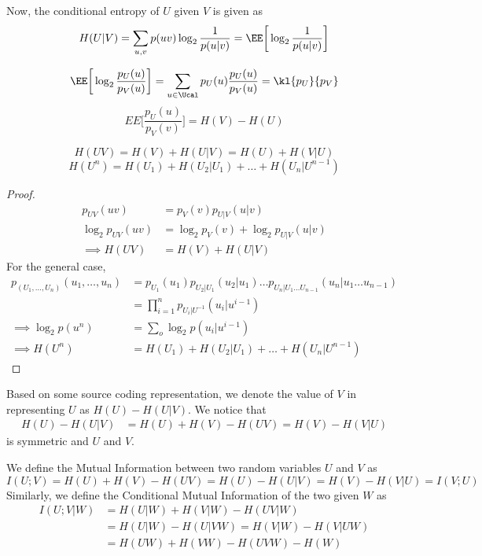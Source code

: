Now, the conditional entropy of $U$ given $V$ is given as
\[H(U|V) = \sum_{u,v} p(uv) \log_2 \frac{1}{p(u|v)} = \EE\bigg[\log_2 \frac{1}{p(u|v)}\bigg] \]
\begin{remark}
\[\EE\bigg[\log_2 \frac{p_U(u)}{p_V(u)}\bigg] = \sum_{u\in \Ucal} p_U(u)\frac{p_U(u)}{p_V(u)} = \kl{p_U}{p_V} \]
\[EE\bigg[\frac{p_U(u)}{p_V(v)}\bigg] = H(V) - H(U)\]
\end{remark}
\begin{theorem}
\[H(UV) = H(V) + H(U|V) = H(U) + H(V|U)\]
\[ H(U^n) = H(U_1) + H(U_2|U_1) + \dots + H(U_n|U^{n-1}) \]
\end{theorem}
\begin{proof}
\begin{align*}
p_{UV}(uv) &= p_V(v) p_{U|V}(u|v) \\
\log_2 p_{UV}(uv) &= \log_2 p_V(v) + \log_2 p_{U|V}(u|v) \\
\implies H(UV) &= H(V) + H(U|V)  
\end{align*}
For the general case, 
\begin{align*}
    p_{(U_1,\dots,U_n)}(u_1,\dots,u_n) &= p_{U_1}(u_1)p_{U_2|U_1}(u_2|u_1)\dots p_{U_n|U_1\dots U_{n-1}}(u_n|u_1\dots u_{n-1}) \\
    &= \prod_{i=1}^n p_{U_i|U^{-1}}(u_i|u^{i-1}) \\
    \implies \log_2 p(u^n) &= \sum_o \log_2 p(u_i|u^{i-1}) \\
    \implies H(U^n) &= H(U_1) + H(U_2|U_1) + \dots + H(U_n | U^{n-1})
\end{align*}
\end{proof}
Based on some source coding representation, we denote the value of $V$ in representing $U$ as $H(U) - H(U|V)$. We notice that
\begin{align*}
    H(U) - H(U|V) &= H(U) + H(V) - H(UV) = H(V) - H(V|U)
\end{align*}
is symmetric and $U$ and $V$. 
\begin{definition}
We define the Mutual Information between two random variables $U$ and $V$ as
\[I(U;V) = H(U) + H(V) - H(UV) = H(U) - H(U|V) = H(V) - H(V|U) = I(V;U)\]
Similarly, we define the Conditional Mutual Information of the two given $W$ as
\begin{align*}
    I(U;V|W) &= H(U|W) + H(V|W) - H(UV|W) \\
    &= H(U|W) - H(U|VW) = H(V|W) - H(V|UW) \\
    &= H(UW) + H(VW) - H(UVW) - H(W)
\end{align*}
\end{definition}
